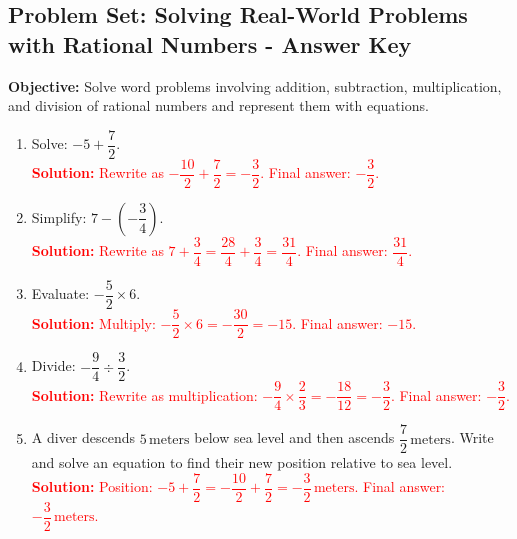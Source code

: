 \documentclass[11pt]{article}
\title{}
\date{}
\begin{document}
\subsection*{Problem Set: Solving Real-World Problems with Rational Numbers - Answer Key}
\onehalfspacing

\begin{tcolorbox}[colframe=black!40, colback=gray!5, 
coltitle=black, colbacktitle=black!20, fonttitle=\bfseries\Large, 
title=Learning Objective, halign title=center, left=5pt, right=5pt, top=5pt, bottom=15pt]
\textbf{Objective:} Solve word problems involving addition, subtraction, multiplication, and division of rational numbers and represent them with equations.
\end{tcolorbox}

\begin{tcolorbox}[colframe=black!60, colback=white, 
coltitle=black, colbacktitle=black!15, fonttitle=\bfseries\Large, 
title=Exercises, halign title=center, left=10pt, right=10pt, top=10pt, bottom=70pt]
\begin{enumerate}[itemsep=1em]
    \item Solve: \( -5 + \dfrac{7}{2} \).\\
    \textcolor{red}{\textbf{Solution:} Rewrite as \( -\dfrac{10}{2} + \dfrac{7}{2} = -\dfrac{3}{2} \). Final answer: \( -\dfrac{3}{2} \).}

    \item Simplify: \( 7 - \left( -\dfrac{3}{4} \right) \).\\
    \textcolor{red}{\textbf{Solution:} Rewrite as \( 7 + \dfrac{3}{4} = \dfrac{28}{4} + \dfrac{3}{4} = \dfrac{31}{4} \). Final answer: \( \dfrac{31}{4} \).}

    \item Evaluate: \( -\dfrac{5}{2} \times 6 \).\\
    \textcolor{red}{\textbf{Solution:} Multiply: \( -\dfrac{5}{2} \times 6 = -\dfrac{30}{2} = -15 \). Final answer: \( -15 \).}

    \item Divide: \( -\dfrac{9}{4} \div \dfrac{3}{2} \).\\
    \textcolor{red}{\textbf{Solution:} Rewrite as multiplication: \( -\dfrac{9}{4} \times \dfrac{2}{3} = -\dfrac{18}{12} = -\dfrac{3}{2} \). Final answer: \( -\dfrac{3}{2} \).}

    \item A diver descends \( 5 \, \text{meters} \) below sea level and then ascends \( \dfrac{7}{2} \, \text{meters} \). Write and solve an equation to find their new position relative to sea level.\\
    \textcolor{red}{\textbf{Solution:} Position: \( -5 + \dfrac{7}{2} = -\dfrac{10}{2} + \dfrac{7}{2} = -\dfrac{3}{2} \, \text{meters}. \) Final answer: \( -\dfrac{3}{2} \, \text{meters}. \)}


\end{enumerate}
\end{tcolorbox}
\end{document}
